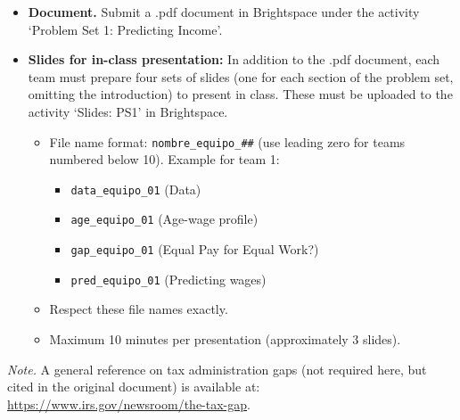 \documentclass[12pt,a4paper,onecolumn]{article}
\begin{document}
\begin{itemize}
  \item \textbf{Document.} Submit a .pdf document in Brightspace under the activity `Problem Set 1: Predicting Income'.
  \item \textbf{Slides for in-class presentation:} In addition to the .pdf document, each team must prepare four sets of slides (one for each section of the problem set, omitting the introduction) to present in class. These must be uploaded to the activity `Slides: PS1' in Brightspace.
  \begin{itemize}
    \item File name format: \texttt{nombre\_equipo\_\#\#} (use leading zero for teams numbered below 10). Example for team 1:
    \begin{itemize}
      \item \texttt{data\_equipo\_01} (Data)
      \item \texttt{age\_equipo\_01} (Age-wage profile)
      \item \texttt{gap\_equipo\_01} (Equal Pay for Equal Work?)
      \item \texttt{pred\_equipo\_01} (Predicting wages)
    \end{itemize}
    \item Respect these file names exactly.
    \item Maximum 10 minutes per presentation (approximately 3 slides).
  \end{itemize}
\end{itemize}

\bigskip
\noindent\textit{Note.} A general reference on tax administration gaps (not required here, but cited in the original document) is available at: \href{https://www.irs.gov/newsroom/the-tax-gap}{https://www.irs.gov/newsroom/the-tax-gap}.
\end{document}
